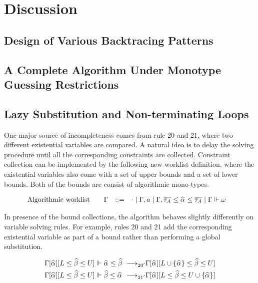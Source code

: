 
\section{Discussion}

\subsection{Design of Various Backtracing Patterns}

\subsection{A Complete Algorithm Under Monotype Guessing Restrictions}



\subsection{Lazy Substitution and Non-terminating Loops}

One major source of incompleteness comes from rule 20 and 21,
where two different existential variables are compared.
A natural idea is to delay the solving procedure until all the corresponding
constraints are collected.
Constraint collection can be implemented by the following new worklist definition,
where the existential variables also come with a set of upper bounds
and a set of lower bounds. Both of the bounds are consist of algorithmic mono-types.

\begin{gather*}
    \begin{aligned}
        \text{Algorithmic worklist}\qquad&\Gm &::=&\quad \cdot \mid \Gm, a \mid \Gm, \overline{\tau_A} \le \al \le \overline{\tau_A} \mid \Gm \Vdash \jg
    \end{aligned}
\end{gather*}

In presence of the bound collections, the algorithm behaves slightly differently
on variable solving rules.
For example, rules 20 and 21 add the corresponding existential variable
as part of a bound rather than performing a global substitution.

\begin{gather*}
    \begin{aligned}
\Gm[\al][L \le \bt \le U] \Vdash \al \le \bt &\rrule{20'}
    \Gm[\al][L \cup \{\al\} \le \bt \le U]\\
\Gm[\al][L \le \bt \le U] \Vdash \bt \le \al &\rrule{21'}
    \Gm[\al][L \le \bt \le U \cup \{\al\}]\\
    \end{aligned}
\end{gather*}

